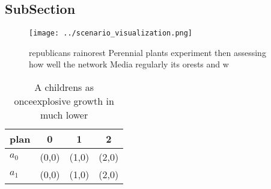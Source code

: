 \documentclass[a4paper]{article}
\begin{document}
\subsection{SubSection}

\begin{figure}
\centering
\texttt{[image: ../scenario\_visualization.png]}
\caption{ republicans rainorest Perennial plants experiment then assessing how well the network Media regularly its orests and w
}
\end{figure}
 
\begin{table}
\begin{adjustbox}{width=0.6\columnwidth}
\begin{tabular}{|l|l|l|l|}
\hline
\textbf{plan} & \multicolumn{1}{c|}{\textbf{0}} & \multicolumn{1}{c|}{\textbf{1}} & \multicolumn{1}{c|}{\textbf{2}} \\ \hline
\textbf{$a_0$}  & (0,0) & (1,0) & (2,0) \\ \hline
\textbf{$a_1$}  & (0,0) & (1,0) & (2,0) \\ \hline
\end{tabular}
\end{adjustbox}
\caption{A childrens as onceexplosive growth in much lower
}
\end{table}
\end{document}
